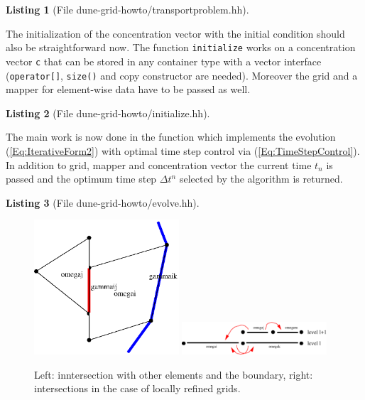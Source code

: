 \documentclass[11pt,a4paper,headinclude,footinclude,DIV16,normalheadings]{scrreprt}
\newtheorem{lst}{Listing}
\begin{document}
\begin{lst}[File dune-grid-howto/transportproblem.hh] \mbox{}
\nopagebreak

\end{lst}

The initialization of the concentration vector with the initial
condition should also be straightforward now. The function
\lstinline!initialize! works on a concentration vector \lstinline!c!
that can be stored in any container type with a vector interface
(\lstinline!operator[]!, \lstinline!size()! and copy constructor are
needed). Moreover the grid and a mapper for element-wise data have to be passed
as well. 

\begin{lst}[File dune-grid-howto/initialize.hh] \mbox{}
\nopagebreak

\end{lst}

The main work is now done in the function which implements the
evolution (\ref{Eq:IterativeForm2}) with optimal time step control via
(\ref{Eq:TimeStepControl}). In addition to grid, mapper and
concentration vector the current time $t_n$ is passed and the optimum
time step $\Delta t^n$ selected by the algorithm is returned.
\begin{lst}[File dune-grid-howto/evolve.hh] \mbox{} \label{List:evolve}
\nopagebreak

\end{lst}

\begin{figure}
\includegraphics[width=0.48\textwidth]{EPS/intersection}\hfill
\includegraphics[width=0.48\textwidth]{EPS/islocalref}
\caption{Left: inntersection with other elements and the boundary,
  right: intersections in the case of locally refined grids.}
\label{Fig:IsIt}
\end{figure}
\end{document}
